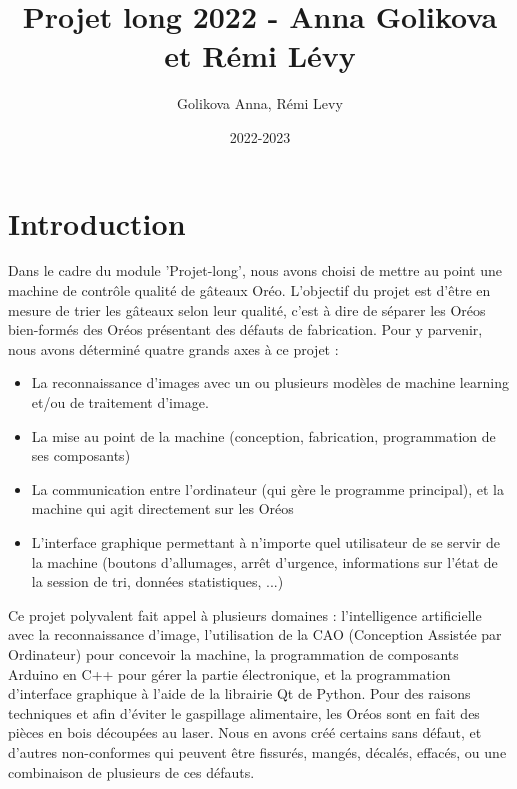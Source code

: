 \documentclass{article}
\author{Golikova Anna, Rémi Levy} %
\title{Projet long 2022 - Anna Golikova et Rémi Lévy} %
\date{2022-2023}
\begin{document}
\maketitle





\section{Introduction}
Dans le cadre du module 'Projet-long', nous avons choisi de mettre au point une machine de contrôle qualité de gâteaux Oréo.
L'objectif du projet est d'être en mesure de trier les gâteaux selon leur qualité, c'est à dire de séparer les Oréos bien-formés des Oréos présentant des défauts de fabrication.
Pour y parvenir, nous avons déterminé quatre grands axes à ce projet :
\begin{itemize}
    \item La reconnaissance d'images avec un ou plusieurs modèles de machine learning et/ou de traitement d'image.
    \item La mise au point de la machine (conception, fabrication, programmation de ses composants)
    \item La communication entre l'ordinateur (qui gère le programme principal), et la machine qui agit directement sur les Oréos
    \item L'interface graphique permettant à n'importe quel utilisateur de se servir de la machine (boutons d'allumages, arrêt d'urgence, informations sur l'état de la session de tri, données statistiques, ...) 
\end{itemize}
Ce projet polyvalent fait appel à plusieurs domaines : l'intelligence artificielle avec la reconnaissance d'image, l'utilisation de la CAO (Conception Assistée par Ordinateur) pour concevoir la machine, la programmation de composants Arduino en C++ pour gérer la partie électronique, et la programmation d'interface graphique à l'aide de la librairie Qt de Python.
Pour des raisons techniques et afin d'éviter le gaspillage alimentaire, les Oréos sont en fait des pièces en bois découpées au laser. Nous en avons créé certains sans défaut, et d'autres non-conformes qui peuvent être fissurés, mangés, décalés, effacés, ou une combinaison de plusieurs de ces défauts. 
\end{document}
